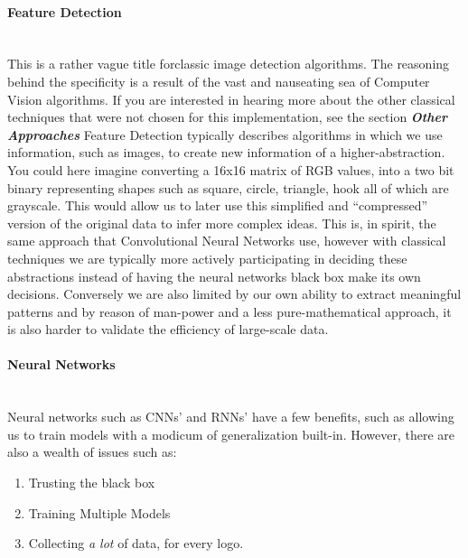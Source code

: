 \documentclass{article}
\begin{document}
\paragraph{Feature Detection} \mbox{}\\

This is a rather vague title forclassic image detection
algorithms.  The reasoning behind the specificity is a
result of the vast and nauseating sea of Computer Vision
algorithms. If you are interested in hearing more about the
other classical techniques that were not chosen for this
implementation, see the section \textbf{\textit{Other Approaches}}
\newline\newline
Feature Detection typically describes algorithms in which we
use information, such as images, to create new information of
a higher-abstraction.  You could here imagine converting a
16x16 matrix of RGB values, into a two bit binary representing
shapes such as {square, circle, triangle, hook} all of which
are grayscale.  This would allow us to later use this simplified
and “compressed” version of the original data to infer more
complex ideas.  This is, in spirit, the same approach that
Convolutional Neural Networks use, however with classical
techniques we are typically more actively participating in
deciding these abstractions instead of having the neural
networks black box make its own decisions.  Conversely we are
also limited by our own ability to extract meaningful patterns
and by reason of man-power and a less pure-mathematical
approach, it is also harder to validate the efficiency of
large-scale data.

\paragraph{Neural Networks} \mbox{}\\

Neural networks such as CNNs’ and RNNs’  have a few benefits,
such as allowing us to train models with a modicum of
generalization built-in. However, there are also a wealth of
issues such as:

\begin{enumerate}
  \item Trusting the black box
  \item Training Multiple Models
  \item Collecting \textit{a lot} of data, for every logo.
\end{enumerate}
\end{document}
